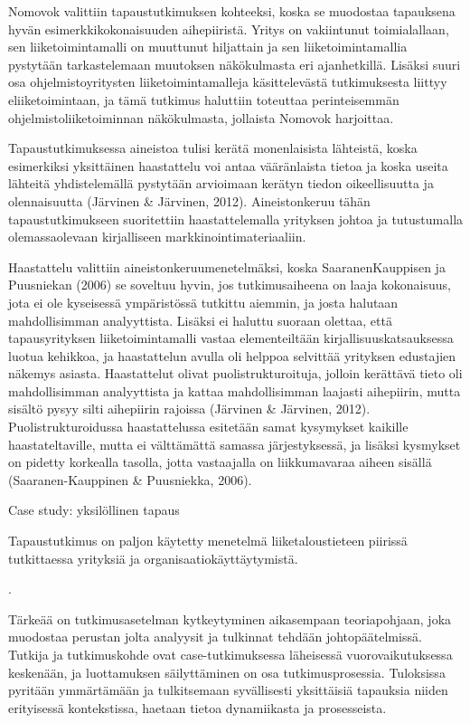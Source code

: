 \documentclass[finnish,12pt,a4paper,pdftex]{article}
\begin{document}
Nomovok valittiin tapaustutkimuksen kohteeksi, koska se muodostaa tapauksena hyvän esimerkkikokonaisuuden aihepiiristä. Yritys on vakiintunut toimialallaan, sen
liiketoimintamalli on muuttunut hiljattain ja sen liiketoimintamallia pystytään tarkastelemaan muutoksen näkökulmasta eri ajanhetkillä. Lisäksi suuri osa ohjelmistoyritysten liiketoimintamalleja käsittelevästä tutkimuksesta liittyy eliiketoimintaan, ja tämä tutkimus haluttiin toteuttaa perinteisemmän ohjelmistoliiketoiminnan näkökulmasta, jollaista Nomovok harjoittaa.

Tapaustutkimuksessa aineistoa tulisi kerätä monenlaisista lähteistä, koska esimerkiksi yksittäinen haastattelu voi antaa vääränlaista tietoa ja koska useita lähteitä yhdistelemällä pystytään arvioimaan kerätyn tiedon oikeellisuutta ja olennaisuutta (Järvinen & Järvinen, 2012). Aineistonkeruu tähän tapaustutkimukseen suoritettiin haastattelemalla yrityksen johtoa ja tutustumalla olemassaolevaan kirjalliseen markkinointimateriaaliin.

Haastattelu valittiin aineistonkeruumenetelmäksi, koska SaaranenKauppisen
ja Puusniekan (2006) se soveltuu hyvin, jos tutkimusaiheena on laaja
kokonaisuus, jota ei ole kyseisessä ympäristössä tutkittu aiemmin, ja josta
halutaan mahdollisimman analyyttista. Lisäksi ei haluttu suoraan olettaa, että
tapausyrityksen liiketoimintamalli vastaa elementeiltään
kirjallisuuskatsauksessa luotua kehikkoa, ja haastattelun avulla oli helppoa
selvittää yrityksen edustajien näkemys asiasta. Haastattelut olivat
puolistrukturoituja, jolloin kerättävä tieto oli mahdollisimman analyyttista ja
kattaa mahdollisimman laajasti aihepiirin, mutta sisältö pysyy silti aihepiirin
rajoissa (Järvinen & Järvinen, 2012). Puolistrukturoidussa haastattelussa
esitetään samat kysymykset kaikille haastateltaville, mutta ei välttämättä
samassa järjestyksessä, ja lisäksi kysmykset on pidetty korkealla tasolla, jotta
vastaajalla on liikkumavaraa aiheen sisällä (Saaranen-Kauppinen & Puusniekka,
2006). 

Case study: yksilöllinen tapaus

Tapaustutkimus on paljon käytetty menetelmä liiketaloustieteen piirissä tutkittaessa yrityksiä ja organisaatiokäyttäytymistä.

.

Tärkeää on tutkimusasetelman kytkeytyminen aikasempaan teoriapohjaan, joka muodostaa perustan jolta analyysit ja tulkinnat tehdään johtopäätelmissä.
Tutkija ja tutkimuskohde ovat case-tutkimuksessa läheisessä vuorovaikutuksessa keskenään, ja luottamuksen säilyttäminen on osa tutkimusprosessia. Tuloksissa pyritään ymmärtämään ja tulkitsemaan syvällisesti yksittäisiä tapauksia niiden erityisessä kontekstissa, haetaan tietoa dynamiikasta ja prosesseista.
\end{document}
